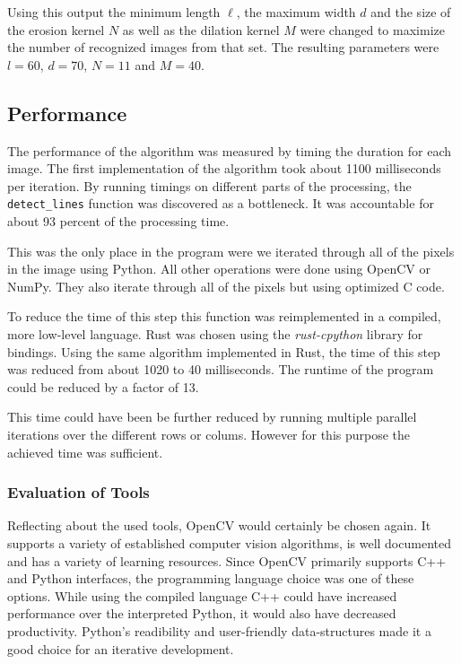 \documentclass[serif,article,noparskip]{agse-thesis}
\begin{document}
Using this output the minimum length $\ell$, the maximum width $d$ and the size
of the erosion kernel $N$ as well as the dilation kernel $M$ were changed to
maximize the number of recognized images from that set. The resulting parameters
were $l = 60$, $d = 70$, $N=11$ and $M =40$.


\subsection{Performance} \label{performance}

The performance of the algorithm was measured by timing the duration for each
image. The first implementation of the algorithm took about 1100 milliseconds per
iteration. By running timings on different parts of the processing, the
\texttt{detect\_lines} function was discovered as a bottleneck. It was
accountable for about 93 percent of the processing time.

This was the only place in the program were we iterated through all of the pixels
in the image using Python. All other operations were done using OpenCV or NumPy.
They also iterate through all of the pixels but using optimized C code.

To reduce the time of this step this function was reimplemented in a compiled,
more low-level language. Rust was chosen using the \textit{rust-cpython} library
for bindings. Using the same algorithm implemented in Rust, the time of this
step was reduced from about 1020 to 40 milliseconds. The runtime of the program
could be reduced by a factor of 13.

This time could have been be further reduced by running multiple parallel
iterations over the different rows or colums. However for this purpose the
achieved time was sufficient.

\subsubsection{Evaluation of Tools}

Reflecting about the used tools, OpenCV would certainly be chosen again. It
supports a variety of established computer vision algorithms, is well documented
and has a variety of learning resources. Since OpenCV primarily supports C++ and
Python interfaces, the programming language choice was one of these options.
While using the compiled language C++ could have increased performance over the
interpreted Python, it would also have decreased productivity. Python's
readibility and user-friendly data-structures made it a good choice for an
iterative development.
\end{document}
